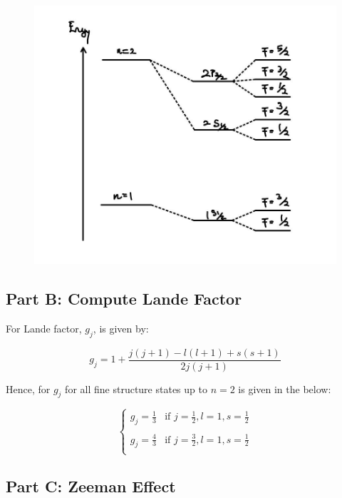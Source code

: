 \documentclass[11pt]{article}
\begin{document}
  \begin{figure}[h!]
    \centering
    \includegraphics[width=5in]{./image/HyperfineStructure_EnergyLevel.jpg}
  \end{figure}

  \subsection{Part B: Compute Lande Factor}

  For Lande factor, $g_j$, is given by:

  \begin{equation}
    g_j = 1 + \frac{j(j + 1) - l(l + 1) + s(s + 1)}{2j(j + 1)}
  \end{equation}

  Hence, for $g_j$ for all fine structure states up to $n = 2$ is given in the below:

  \begin{equation}
    \begin{cases}
      \displaystyle
      g_j = \frac{1}{3  } & \text{if } j = \frac{1}{2}, l = 1, s = \frac{1}{2} \\
      \\
      \displaystyle
      g_j = \frac{4}{3} & \text{if } j = \frac{3}{2}, l = 1, s = \frac{1}{2} \\
    \end{cases}
  \end{equation}

  \subsection{Part C: Zeeman Effect}
\end{document}
